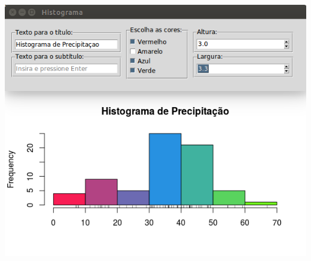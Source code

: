 \begin{frame}
\begin{columns}[t]
\begin{column}{.6\textwidth}
{{          \includegraphics[scale=0.3]{images/preview_gwidgets}}}
       
\end{column}
\end{columns}
\end{frame}
